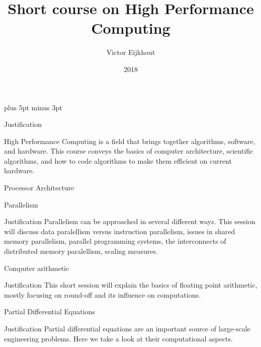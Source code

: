 \documentclass[11pt,headernav]{beamer}
\begin{document}
\parskip=10pt plus 5pt minus 3pt

\title{Short course on High Performance Computing}
\author{Victor Eijkhout}
\date{2018}

\begin{frame}
  \titlepage
\end{frame}

\begin{frame}
  \tableofcontents
\end{frame}

\begin{frame}{Justification}

High Performance Computing is a field that brings together
algorithms, software, and hardware. This course
conveys the basics of computer architecture,
scientific algorithms, and how to code
algorithms to make them efficient on current hardware.

\end{frame}


 {Processor Architecture}


 {Parallelism}

\begin{frame}{Justification}
  Parallelism can be approached in several different ways.
  This session will discuss data paralellism versus instruction parallelism,
  issues in shared memory parallelism, parallel programming systems,
  the interconnects of distributed memory paralellism,
  scaling measures.
\end{frame}



 {Computer arithmetic}

\begin{frame}{Justification}
  This short session will explain the basics of floating point
  arithmetic, mostly focusing on round-off and its influence
  on computations.
\end{frame}



 {Partial Differential Equations}

\begin{frame}{Justification}
  Partial differential equations are an important source of 
  large-scale engineering problems. Here we take a look at
  their computational aspects.
\end{frame}


\end{document}
